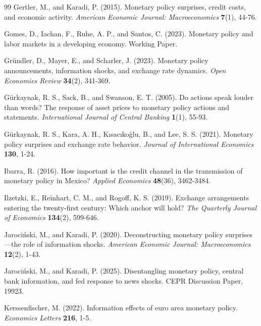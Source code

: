 \documentclass[12pt, reqno]{article}
\begin{document}
\begin{thebibliography}{99}
\bibitem{} \hypertarget{Gertler and Karadi (2015)}{}Gertler, M., and Karadi, P. (2015). Monetary policy surprises, credit costs, and economic activity. \textit{American Economic Journal: Macroeconomics} \textbf{7}(1), 44-76.



\bibitem{} \hypertarget{Gomes et al. (2023)}{} 
Gomes, D., Iachan, F., Ruhe, A. P., and Santos, C. (2023). Monetary policy and labor markets in a developing economy. Working Paper.

\bibitem{} \hypertarget{Gründler et al. (2023)}{} Gründler, D., Mayer, E., and Scharler, J. (2023). Monetary policy announcements, information shocks, and exchange rate dynamics. \textit{Open Economies Review} \textbf{34}(2), 341-369.

\bibitem{} \hypertarget{Gurkaynak et al. (2005)}{} Gürkaynak, R. S., Sack, B., and Swanson, E. T. (2005). Do actions speak louder than words? The response of asset prices to monetary policy actions and statements. \textit{International Journal of Central Banking} \textbf{1}(1), 55-93.

\bibitem{} \hypertarget{Gurkaynak et al. (2021)}{} Gürkaynak, R. S., Kara, A. H., Kısacıkoğlu, B., and Lee, S. S. (2021). Monetary policy surprises and exchange rate behavior. \textit{Journal of International Economics} \textbf{130}, 1-24.

\bibitem{} \hypertarget{Ibarra (2016)}{}Ibarra, R. (2016). How important is the credit channel in the transmission of monetary policy in Mexico? \textit{Applied Economics} \textbf{48}(36), 3462-3484.

\bibitem{} \hypertarget{Ilzetzki et al. (2019)}{}
Ilzetzki, E., Reinhart, C. M., and Rogoff, K. S. (2019). Exchange arrangements entering the twenty-first century: Which anchor will hold? \textit{The Quarterly Journal of Economics} \textbf{134}(2), 599-646.

\bibitem{} \hypertarget{JK (2020)}{} Jarociński, M., and Karadi, P. (2020). Deconstructing monetary policy surprises—the role of information shocks. \textit{American Economic Journal: Macroeconomics} \textbf{12}(2), 1-43.

\bibitem{} \hypertarget{Jarocinski and Karadi (2025)}{} 
Jarociński, M., and Karadi, P. (2025). Disentangling monetary policy, central bank information, and fed response to news shocks. CEPR Discussion Paper, 19923.

\bibitem{} \hypertarget{Kerssenfischer (2022)}{} Kerssenfischer, M. (2022). Information effects of euro area monetary policy. \textit{Economics Letters} \textbf{216}, 1-5.


\end{thebibliography}
\end{document}
